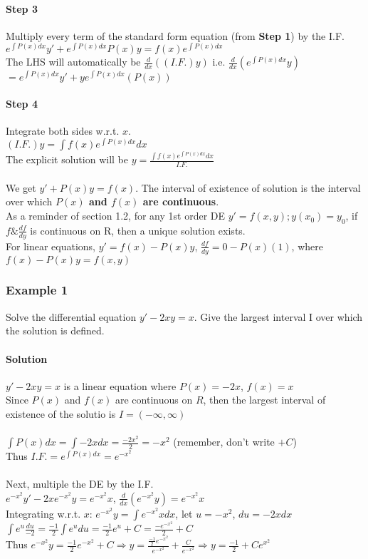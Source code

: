 \documentclass{article}
\begin{document}
\paragraph{Step 3} Multiply every term of the standard form equation (from \textbf{Step 1}) by the I.F.
\large \\$e^{\int\!P(x)dx}y'+e^{\int\!P(x)dx}P(x)y=f(x)e^{\int\!P(x)dx}$
\normalsize
\\The LHS will automatically be $\frac{d}{dx}((I.F.)y)$ i.e. $\frac{d}{dx}\left(e^{\int\!P(x)dx}y\right)$
\\$=e^{\int\!P(x)dx}y'+ye^{\int\!P(x)dx}(P(x))$

\paragraph{Step 4} Integrate both sides w.r.t. $x$.
\\$(I.F.)y=\int f(x)e^{\int P(x)dx}dx$
\\The explicit solution will be \Large $y=\frac{\int f(x)e^{\int P(x)dx}dx}{I.F.}$\normalsize
\\\\We get $y'+P(x)y=f(x)$. The interval of existence of solution is the interval over which \textbf{$P(x)$ and $f(x)$ are continuous}.
\\As a reminder of section 1.2, for any 1st order DE $y'=f(x,y);y(x_0)=y_0$, if $f\&\frac{df}{dy}$ is continuous on R, then a unique solution exists.
\\For linear equations, $y'=f(x)-P(x)y$, $\frac{df}{dy}=0-P(x)(1)$, where $f(x)-P(x)y=f(x,y)$

\subsubsection{Example 1}
Solve the differential equation $y'-2xy=x$. Give the largest interval I over which the solution is defined.

\paragraph{Solution} $y'-2xy=x$ is a linear equation where $P(x)=-2x$, $f(x)=x$
\\Since $P(x)$ and $f(x)$ are continuous on $R$, then the largest interval of existence of the solutio is $I=(-\infty,\infty)$
\\\\$\int P(x)dx=\int -2xdx=\frac{-2x^2}{2}=-x^2$ (remember, don't write $+C$)
\\Thus $I.F.=e^{\int\!P(x)dx}=e^{-x^2}$
\\\\Next, multiple the DE by the I.F.
\\$e^{-x^2}y'-2xe^{-x^2}y=e^{-x^2}x$, $\frac{d}{dx}\left(e^{-x^2}y\right)=e^{-x^2}x$
\\Integrating w.r.t. $x$: $e^{-x^2}y=\int e^{-x^2}xdx$, let $u=-x^2$, $du=-2xdx$
\\$\int e^u\frac{du}{-2}=\frac{-1}{2}\int e^udu=\frac{-1}{2}e^u+C=\frac{-e^{-x^2}}{2}+C$
\\Thus $e^{-x^2}y=\frac{-1}{2}e^{-x^2}+C\Rightarrow y=\frac{\frac{-1}{2}e^{-x^2}}{e^{-x^2}}+\frac{C}{e^{-x^2}}\Rightarrow y=\frac{-1}{2}+Ce^{x^2}$
\newpage
\end{document}
